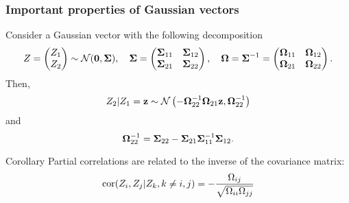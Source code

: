 \begin{frame}
  \frametitle{Important properties of Gaussian vectors}

  \begin{proposition}
    Consider a Gaussian vector with the following decomposition
    \begin{equation*}
      Z = \begin{pmatrix}
        Z_1 \\ Z_2
      \end{pmatrix}  \sim   \mathcal{N}(\mathbf{0},\boldsymbol{\Sigma}),   \quad
      \boldsymbol{\Sigma} = \begin{pmatrix}
        \boldsymbol{\Sigma}_{11} & \boldsymbol{\Sigma}_{12} \\
        \boldsymbol{\Sigma}_{21} & \boldsymbol{\Sigma}_{22} \\
      \end{pmatrix},\quad
      \boldsymbol{\Omega} = \boldsymbol{\Sigma}^{-1} = \begin{pmatrix}
        \boldsymbol{\Omega}_{11} & \boldsymbol{\Omega}_{12} \\
        \boldsymbol{\Omega}_{21} & \boldsymbol{\Omega}_{22} \\
      \end{pmatrix}.
    \end{equation*}
    Then,
    \begin{equation*}
      Z_2|Z_1=\mathbf{z} \sim
      \mathcal{N}\left(-\boldsymbol{\Omega}_{22}^{-1}\boldsymbol{\Omega}_{21}\mathbf{z}, \boldsymbol{\Omega}_{22}^{-1} \right)
    \end{equation*}
    and
    \begin{equation*}
      \boldsymbol{\Omega}_{22}^{-1}     =      \boldsymbol{\Sigma}_{22}     -     \boldsymbol{\Sigma}_{21}
      \boldsymbol{\Sigma}_{11}^{-1} \boldsymbol{\Sigma}_{12}.
    \end{equation*}
  \end{proposition}

  \vfill

  \begin{block}{Corollary}
    Partial correlations are related  to the inverse of the covariance
    matrix:
    \begin{equation*}
      \mathrm{cor}(Z_i,Z_j|Z_k, k\neq i,j) = - \frac{\Omega_{ij}}{\sqrt{\Omega_{ii}\Omega_{jj}}}
  \end{equation*}
  \end{block}

\end{frame}

